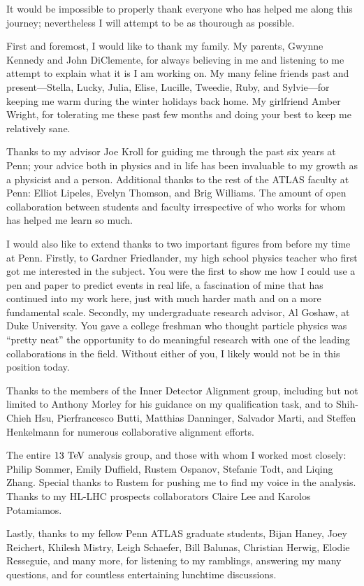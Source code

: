 It would be impossible to properly thank everyone who has helped me along this journey; nevertheless I will attempt to be as thourough as possible.

First and foremost, I would like to thank my family.
My parents, Gwynne Kennedy and John DiClemente, for always believing in me and listening to me attempt to explain what it is I am working on.
My many feline friends past and present---Stella, Lucky, Julia, Elise, Lucille, Tweedie, Ruby, and Sylvie---for keeping me warm during the winter holidays back home.
My girlfriend Amber Wright, for tolerating me these past few months and doing your best to keep me relatively sane.

Thanks to my advisor Joe Kroll for guiding me through the past six years at Penn; your advice both in physics and in life has been invaluable to my growth as a physicist and a person.
Additional thanks to the rest of the ATLAS faculty at Penn: Elliot Lipeles, Evelyn Thomson, and Brig Williams.
The amount of open collaboration between students and faculty irrespective of who works for whom has helped me learn so much.

I would also like to extend thanks to two important figures from before my time at Penn.
Firstly, to Gardner Friedlander, my high school physics teacher who first got me interested in the subject.
You were the first to show me how I could use a pen and paper to predict events in real life, a fascination of mine that has continued into my work here, just with much harder math and on a more fundamental scale.
Secondly, my undergraduate research advisor, Al Goshaw, at Duke University.
You gave a college freshman who thought particle physics was ``pretty neat'' the opportunity to do meaningful research with one of the leading collaborations in the field.
Without either of you, I likely would not be in this position today.

Thanks to the members of the Inner Detector Alignment group, including but not limited to Anthony Morley for his guidance on my qualification task, and to Shih-Chieh Hsu, Pierfrancesco Butti, Matthias Danninger, Salvador Marti, and Steffen Henkelmann for numerous collaborative alignment efforts.

The entire \ssww $13\tev$ analysis group, and those with whom I worked most closely: Philip Sommer, Emily Duffield, Rustem Ospanov, Stefanie Todt, and Liqing Zhang.
Special thanks to Rustem for pushing me to find my voice in the analysis.
Thanks to my \ssww HL-LHC prospects collaborators Claire Lee and Karolos Potamiamos.

Lastly, thanks to my fellow Penn ATLAS graduate students, Bijan Haney, Joey Reichert, Khilesh Mistry, Leigh Schaefer, Bill Balunas, Christian Herwig, Elodie Resseguie, and many more, for listening to my ramblings, answering my many questions, and for countless entertaining lunchtime discussions.
